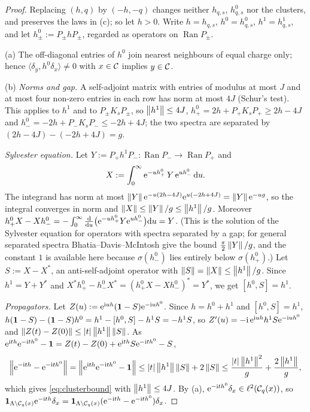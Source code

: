 \begin{proof}
Replacing $(h,q)$ by $(-h,-q)$ changes neither $h_{q,s}$, $h^0_{q,s}$ nor the clusters, and preserves the laws in
(c); so let $h>0$.  Write $h=h_{q,s}$, $h^0=h^0_{q,s}$, $h^1=h^1_{q,s}$, and let $h^0_\pm:=P_\pm hP_\pm$, regarded as
operators on $\operatorname{Ran}P_\pm$.

(a) The off-diagonal entries of $h^0$ join nearest neighbours of equal charge only; hence
$\langle\delta_y,h^0\delta_x\rangle\ne0$ with $x\in\mathcal{C}$ implies $y\in\mathcal{C}$.

(b) \emph{Norms and gap.}  A self-adjoint matrix with entries of modulus at most $J$ and at most four non-zero
entries in each row has norm at most $4J$ (Schur's test).  This applies to $h^1$ and to $P_\pm K_sP_\pm$, so
$\left\|h^1\right\|\le4J$, $h^0_+=2h+P_+K_sP_+\ge2h-4J$ and $h^0_-=-2h+P_-K_sP_-\le-2h+4J$; the two spectra are separated
by $(2h-4J)-(-2h+4J)=g$.

\emph{Sylvester equation.}  Let $Y:=P_+h^1P_-:\operatorname{Ran}P_-\to\operatorname{Ran}P_+$ and
\[
  X:=\int_0^\infty\mathrm{e}^{-uh^0_+}\,Y\,\mathrm{e}^{uh^0_-}\,\mathrm{d} u .
\]
The integrand has norm at most $\left\|Y\right\|\mathrm{e}^{-u(2h-4J)}\mathrm{e}^{u(-2h+4J)}=\left\|Y\right\|\mathrm{e}^{-ug}$, so the integral converges in
norm and $\left\|X\right\|\le\left\|Y\right\|/g\le\left\|h^1\right\|/g$.  Moreover
$h^0_+X-Xh^0_-=-\int_0^\infty\frac{\mathrm{d}}{\mathrm{d} u}\bigl(\mathrm{e}^{-uh^0_+}Y\mathrm{e}^{uh^0_-}\bigr)\mathrm{d} u=Y$.  (This is the solution of
the Sylvester equation for operators with spectra separated by a gap; for general separated spectra
Bhatia--Davis--McIntosh \cite{BDM1983} give the bound $\frac\pi2\left\|Y\right\|/g$, and the constant $1$ is available
here because $\sigma(h^0_-)$ lies entirely below $\sigma(h^0_+)$.)  Let $S:=X-X^*$, an anti-self-adjoint operator
with $\left\|S\right\|=\left\|X\right\|\le\left\|h^1\right\|/g$.  Since $h^1=Y+Y^*$ and
$X^*h^0_+-h^0_-X^*=(h^0_+X-Xh^0_-)^*=Y^*$, we get $[h^0,S]=h^1$.

\emph{Propagators.}  Let $Z(u):=\mathrm{e}^{\mathrm{i} uh}(\mathbf{1}-S)\mathrm{e}^{-\mathrm{i} uh^0}$.  Since $h=h^0+h^1$ and $[h^0,S]=h^1$,
$h(\mathbf{1}-S)-(\mathbf{1}-S)h^0=h^1-[h^0,S]-h^1S=-h^1S$, so $Z'(u)=-\mathrm{i}\,\mathrm{e}^{\mathrm{i} uh}h^1S\mathrm{e}^{-\mathrm{i} uh^0}$ and
$\left\|Z(t)-Z(0)\right\|\le\left|t\right|\left\|h^1\right\|\left\|S\right\|$.  As $\mathrm{e}^{\mathrm{i} th}\mathrm{e}^{-\mathrm{i} th^0}-\mathbf{1}=Z(t)-Z(0)+\mathrm{e}^{\mathrm{i} th}S\mathrm{e}^{-\mathrm{i} th^0}-S$,
\[
  \left\|\mathrm{e}^{-\mathrm{i} th}-\mathrm{e}^{-\mathrm{i} th^0}\right\|=\left\|\mathrm{e}^{\mathrm{i} th}\mathrm{e}^{-\mathrm{i} th^0}-\mathbf{1}\right\|\le\left|t\right|\left\|h^1\right\|\left\|S\right\|+2\left\|S\right\|
  \le\frac{\left|t\right|\left\|h^1\right\|^2}{g}+\frac{2\left\|h^1\right\|}{g},
\]
which gives \eqref{eq:clusterbound} with $\left\|h^1\right\|\le4J$.  By (a), $\mathrm{e}^{-\mathrm{i} th^0}\delta_x\in\ell^2(\mathcal{C}_q(x))$, so
$\mathbf{1}_{\Lambda\setminus\mathcal{C}_q(x)}\mathrm{e}^{-\mathrm{i} th}\delta_x=\mathbf{1}_{\Lambda\setminus\mathcal{C}_q(x)}(\mathrm{e}^{-\mathrm{i} th}-\mathrm{e}^{-\mathrm{i} th^0})\delta_x$.


\end{proof}
